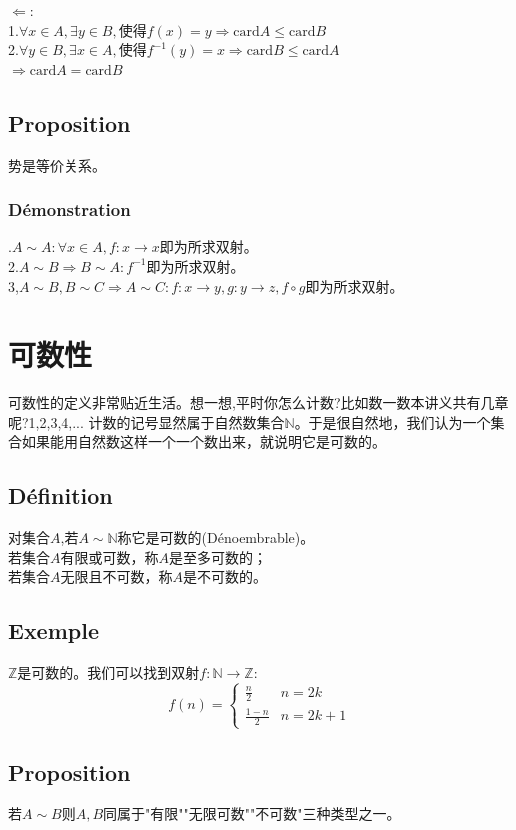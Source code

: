 \documentclass[12pt, a4paper, oneside]{ctexbook}
\begin{document}
  \noindent $\Leftarrow$:\\
  1.$\forall x\in A, \exists y\in B,\text{使得} f(x)=y\Rightarrow\text{card}A\leq\text{card}B$\\
  2.$\forall y\in B, \exists x\in A,\text{使得} f^{-1}(y)=x\Rightarrow\text{card}B\leq\text{card}A$\\
  $\Rightarrow \text{card}A=\text{card}B$
  \subsection{Proposition}\label{myref:carddengjia}
  势是等价关系。
  \subsubsection{Démonstration}
  .$A\sim A:\forall x\in A, f:x\rightarrow x$即为所求双射。\\
  2.$A\sim B\Rightarrow B\sim A: f^{-1}$即为所求双射。\\
  3,$A\sim B,B\sim C\Rightarrow A\sim C:f:x\rightarrow y,g:y\rightarrow z,f\circ g $即为所求双射。\\
  
\section{可数性}
  可数性的定义非常贴近生活。想一想,平时你怎么计数?比如数一数本讲义共有几章呢?1,2,3,4,...
  计数的记号显然属于自然数集合$\mathbb{N}$。于是很自然地，我们认为一个集合如果能用自然数这样一个一个数出来，就说明它是可数的。
  \subsection{Définition}
  \noindent 
  对集合$A$,若$A\sim\mathbb{N} $称它是可数的(Dénoembrable)。\\
  若集合$A$有限或可数，称$A$是至多可数的；\\
  若集合$A$无限且不可数，称$A$是不可数的。
  \subsection{Exemple}\label{myref:Zkeshu}
  $\mathbb{Z}$是可数的。我们可以找到双射$f:\mathbb{N}\rightarrow\mathbb{Z}$:
  $$
    f(n)=\begin{cases}
    \frac{n}{2} &n=2k\\
    \frac{1-n}{2} &n=2k+1
    \end{cases}
  $$
  \subsection{Proposition}
  若$A\sim B$则$A,B$同属于"有限""无限可数""不可数"三种类型之一。
\end{document}
